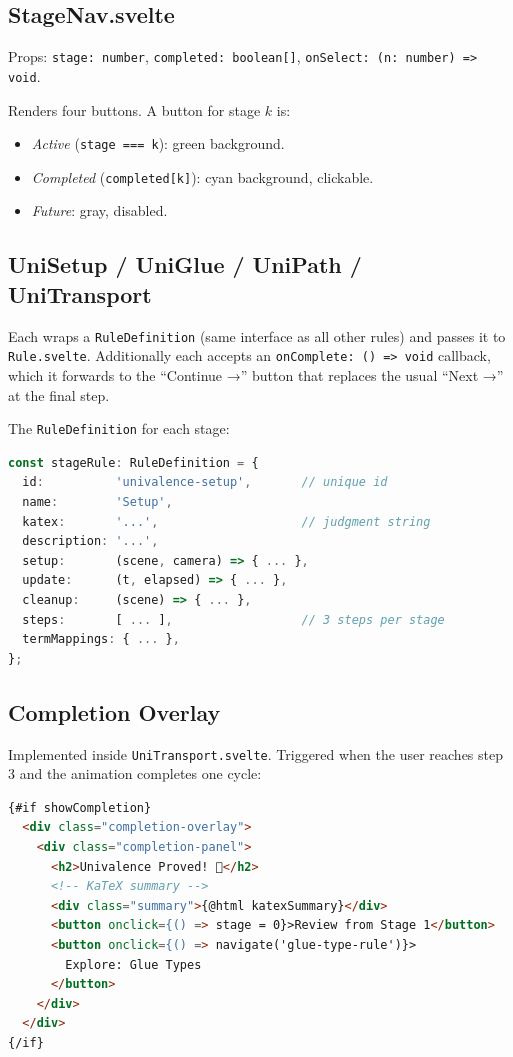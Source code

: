 \documentclass[11pt,a4paper]{article}
\begin{document}
\subsection{StageNav.svelte}

Props: \texttt{stage: number}, \texttt{completed: boolean[]},
\texttt{onSelect: (n: number) => void}.

Renders four buttons.  A button for stage $k$ is:
\begin{itemize}
  \item \textit{Active} (\texttt{stage === k}): green background.
  \item \textit{Completed} (\texttt{completed[k]}): cyan background, clickable.
  \item \textit{Future}: gray, disabled.
\end{itemize}

\subsection{UniSetup / UniGlue / UniPath / UniTransport}

Each wraps a \texttt{RuleDefinition} (same interface as all other rules) and
passes it to \texttt{Rule.svelte}. Additionally each accepts an
\texttt{onComplete: () => void} callback, which it forwards to the ``Continue
→'' button that replaces the usual ``Next →'' at the final step.

The \texttt{RuleDefinition} for each stage:
\begin{lstlisting}[language=typescript]
const stageRule: RuleDefinition = {
  id:          'univalence-setup',       // unique id
  name:        'Setup',
  katex:       '...',                    // judgment string
  description: '...',
  setup:       (scene, camera) => { ... },
  update:      (t, elapsed) => { ... },
  cleanup:     (scene) => { ... },
  steps:       [ ... ],                  // 3 steps per stage
  termMappings: { ... },
};
\end{lstlisting}

\subsection{Completion Overlay}

Implemented inside \texttt{UniTransport.svelte}. Triggered when the user
reaches step 3 and the animation completes one cycle:

\begin{lstlisting}[language=html]
{#if showCompletion}
  <div class="completion-overlay">
    <div class="completion-panel">
      <h2>Univalence Proved! 🎉</h2>
      <!-- KaTeX summary -->
      <div class="summary">{@html katexSummary}</div>
      <button onclick={() => stage = 0}>Review from Stage 1</button>
      <button onclick={() => navigate('glue-type-rule')}>
        Explore: Glue Types
      </button>
    </div>
  </div>
{/if}
\end{lstlisting}
\end{document}

